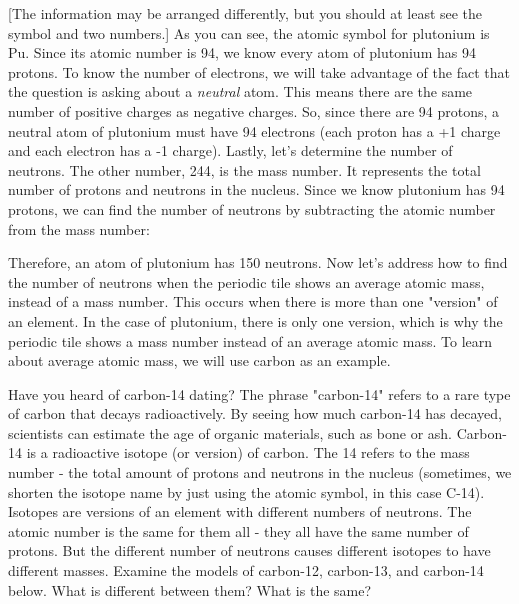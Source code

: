 [The information may be arranged differently, but you should at least see the
symbol and two numbers.] As you can see, the atomic symbol for plutonium is Pu.
Since its atomic number is 94, we know every atom of plutonium has 94 protons.
To know the number of electrons, we will take advantage of the fact that the
question is asking about a \textit{neutral} atom. This means there are the same
number of positive charges as negative charges. So, since there are 94 protons,
a neutral atom of plutonium must have 94 electrons (each proton has a +1 charge
and each electron has a -1 charge). Lastly, let's determine the number of
neutrons. The other number, 244, is the mass number. It represents the total
number of protons and neutrons in the nucleus. Since we know plutonium has 94
protons, we can find the number of neutrons by subtracting the atomic number
from the mass number:

\begin{center}
\end{center}

Therefore, an atom of plutonium has 150 neutrons. Now let's address how to find
the number of neutrons when the periodic tile shows an average atomic mass,
instead of a mass number. This occurs when there is more than one "version" of
an element. In the case of plutonium, there is only one version, which is why
the periodic tile shows a mass number instead of an average atomic mass. To
learn about average atomic mass, we will use carbon as an example.

Have you heard of carbon-14 dating? The phrase "carbon-14" refers to a rare
type of carbon that decays radioactively. By seeing how much carbon-14 has
decayed, scientists can estimate the age of organic materials, such as bone or
ash. Carbon-14 is a radioactive isotope (or version) of carbon. The 14 refers to
the mass number - the total amount of protons and neutrons in the nucleus
(sometimes, we shorten the isotope name by just using the atomic symbol, in
this case C-14). Isotopes are versions of an element with different numbers of
neutrons. The atomic number is the same for them all - they all have the same
number of protons. But the different number of neutrons causes different
isotopes to have different masses. Examine the models of carbon-12, carbon-13,
and carbon-14 below. What is different between them? What is the same?



